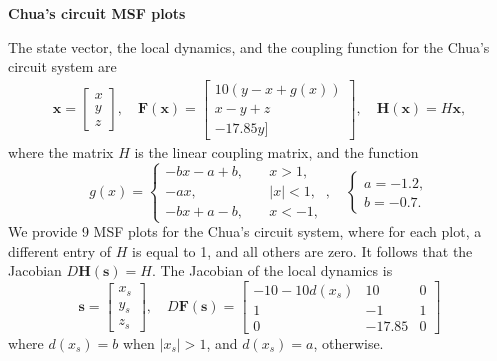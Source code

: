 \documentclass[%
 reprint,
 amsmath,amssymb,
 aip,
]{revtex4-2}
\def \bF {\pmb{F}}
\def \bH {\pmb{H}}
\def \bx {\pmb{x}}
\def \bs {\pmb{s}}
\theoremstyle{italichead}
\theoremstyle{definition}
\begin{document}
{\textbf{Chua's circuit MSF plots}

The state vector, the local dynamics, and the coupling function for the Chua's circuit system are 
\begin{align}
    \bx = \begin{bmatrix}
        x \\ y \\ z
    \end{bmatrix}, \quad \bF (\bx) = \begin{bmatrix}
        10( y - x + g(x) ) \\
        x - y + z \\
        -17.85y]
    \end{bmatrix}, \quad \bH(\bx) = H \bx,
\end{align}
where the matrix $H$ is the linear coupling matrix, and the function 
\begin{equation}
    g(x) = \begin{cases}
        - bx - a + b, & \quad x > 1, \\
        - ax, & \quad  |x| < 1, \\
        - bx + a - b, & \quad x < -1,
    \end{cases}, \quad \begin{cases}
        a = -1.2, \\
        b = -0.7.
    \end{cases}
\end{equation}
We provide 9 MSF plots for the Chua's circuit system, where for each plot, a different entry of $H$ is equal to 1, and all others are zero.
It  follows that the Jacobian $D\bH(\bs) = H$.
The Jacobian of the local dynamics is
\begin{equation}
    \bs = \begin{bmatrix}
        x_s \\ y_s \\ z_s
    \end{bmatrix}, \quad D \bF (\bs) = \begin{bmatrix}
        -10-10 d(x_s) & 10 & 0 \\
    1 & -1 & 1 \\
    0 & -17.85 & 0
    \end{bmatrix}
\end{equation}
where $d(x_s) = b$ when $|x_s| > 1$, and $d(x_s) = a$, otherwise.



}
\end{document}
